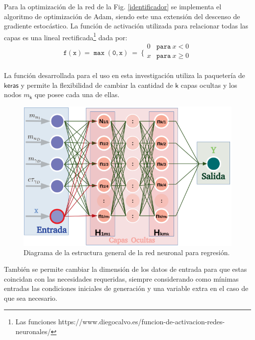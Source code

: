 Para la optimización de la red de la Fig. \ref{identificador} se implementa el algoritmo de optimización de Adam, siendo este una extensión del descenso de gradiente estocástico. La función de activación utilizada para relacionar todas las capas es una lineal rectificada\footnote{Las funciones https://www.diegocalvo.es/funcion-de-activacion-redes-neuronales/} dada por:
\begin{equation}\label{relu}
\mathtt{f(x)=\max (0,x)} ~ = ~ \Bigg\{\begin{matrix}
0 & \mathtt{para }~ x<0\\
x & \mathtt{para }~ x\geq 0\\
\end{matrix} 
\end{equation}


La función desarrollada para el uso en esta investigación utiliza la paquetería de $\textsf{keras}$ y permite la flexibilidad de cambiar la cantidad de $\textsf{k}$ capas ocultas y los nodos $m_\textsf{k}$ que posee cada una de ellas.



\begin{figure}[!t]
\centering
\includegraphics[width=.9\textwidth]{Simulacion/imagenes/neuronas.png}
\caption{Diagrama de la estructura general de la red neuronal para regresión.}
\label{neuronas}
\end{figure}

También se permite cambiar la dimensión de los datos de entrada para que estas coincidan con las necesidades requeridas, siempre considerando como mínimas entradas las condiciones iniciales de generación y una variable extra en el caso de que sea necesario.

